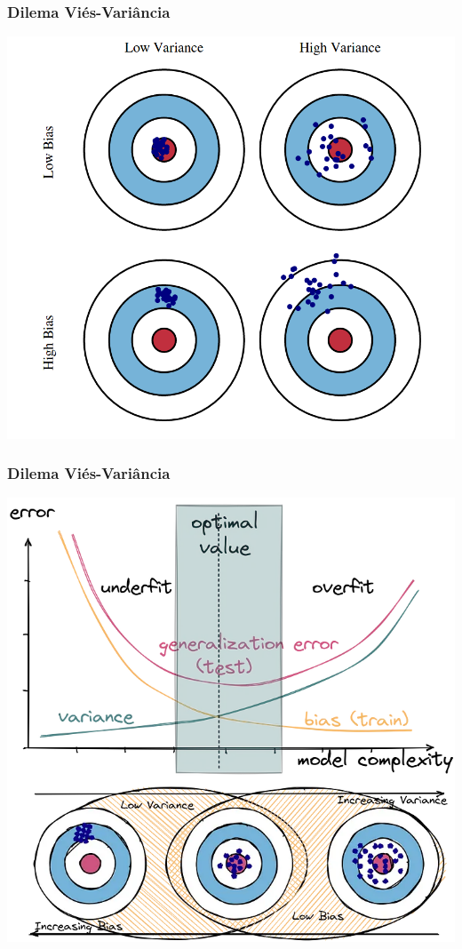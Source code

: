 \begin{frame}
    \frametitle{Dilema Viés-Variância}
    \begin{center}
        \includegraphics[width=0.55\paperwidth]{./imgs/fig10-bias-variance.png}
    \end{center}\end{frame}

\begin{frame}
    \frametitle{Dilema Viés-Variância}
    \begin{center}
        \includegraphics[width=0.55\paperwidth]{./imgs/fig11-bias-variance.png}
    \end{center}
\end{frame}


